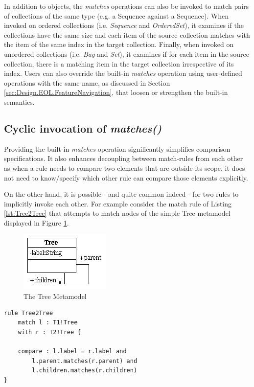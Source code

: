 In addition to objects, the \emph{matches} operations can also be invoked to match pairs of collections of the same type (e.g. a Sequence against a Sequence). When invoked on ordered collections (i.e. \emph{Sequence} and \emph{OrderedSet}), it examines if the collections have the same size and each item of the source collection matches with the item of the same index in the target collection. Finally, when invoked on unordered collections (i.e. \emph{Bag} and \emph{Set}), it examines if for each item in the source collection, there is a matching item in the target collection irrespective of its index. Users can also override the built-in \emph{matches} operation using user-defined operations with the same name, as discussed in Section \ref{sec:Design.EOL.FeatureNavigation}, that loosen or strengthen the built-in semantics.

\subsection{Cyclic invocation of \emph{matches()}}

Providing the built-in \emph{matches} operation significantly simplifies comparison specifications. It also enhances decoupling between match-rules from each other as when a rule needs to compare two elements that are outside its scope, it does not need to know/specify which other rule can compare those elements explicitly.

On the other hand, it is possible - and quite common indeed - for two rules to implicitly invoke each other. For example consider the match rule of Listing \ref{lst:Tree2Tree} that attempts to match nodes of the simple Tree metamodel displayed in Figure \ref{fig:Tree}.

\begin{figure}
	\centering
		\includegraphics{images/metamodels/Tree.png}
	\caption{The Tree Metamodel}
	\label{fig:Tree}
\end{figure}

\begin{lstlisting}[caption=The Tree2Tree rule, label=lst:Tree2Tree, language=ECL]
rule Tree2Tree 
	match l : T1!Tree
	with r : T2!Tree {
	
	compare : l.label = r.label and 
		l.parent.matches(r.parent) and
		l.children.matches(r.children)
}
\end{lstlisting}

